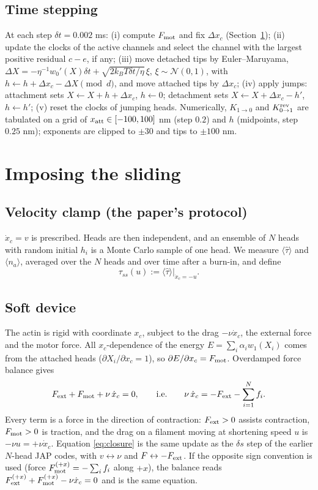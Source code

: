 \documentclass[11pt,a4paper]{article}
\newcommand{\kBT}{k_BT}
\begin{document}
\subsection{Time stepping}
At each step $\delta t=0.002$ ms: (i) compute $F_{\rm mot}$ and fix $\Delta x_c$ (Section~\ref{sec:closure}); (ii) update the clocks of the active channels and select the channel with the largest positive residual $c-e$, if any; (iii) move detached tips by Euler--Maruyama, $\Delta X=-\eta^{-1}w_0'(X)\delta t+\sqrt{2\kBT\delta t/\eta}\,\xi$, $\xi\sim\mathcal N(0,1)$, with $h\leftarrow h+\Delta x_c-\Delta X \pmod d$, and move attached tips by $\Delta x_c$; (iv) apply jumps: attachment sets $X\leftarrow X+h+\Delta x_c$, $h\leftarrow0$; detachment sets $X\leftarrow X+\Delta x_c-h'$, $h\leftarrow h'$; (v) reset the clocks of jumping heads. Numerically, $K_{1\to0}$ and $K^{\rm rev}_{0\to1}$ are tabulated on a grid of $x_{\rm att}\in[-100,100]$ nm (step $0.2$) and $h$ (midpoints, step $0.25$ nm); exponents are clipped to $\pm30$ and tips to $\pm100$ nm.

\section{Imposing the sliding}
\label{sec:closure}

\subsection{Velocity clamp (the paper's protocol)}
$\dot x_c=v$ is prescribed. Heads are then independent, and an ensemble of $N$ heads with random initial $h_i$ is a Monte Carlo sample of one head. We measure $\langle\hat\tau\rangle$ and $\langle n_a\rangle$, averaged over the $N$ heads and over time after a burn-in, and define
\begin{equation}
\tau_{ss}(u):=\langle\hat\tau\rangle\big|_{\dot x_c=-u}.
\end{equation}

\subsection{Soft device}
The actin is rigid with coordinate $x_c$, subject to the drag $-\nu\dot x_c$, the external force and the motor force. All $x_c$-dependence of the energy $E=\sum_i\alpha_iw_1(X_i)$ comes from the attached heads ($\partial X_i/\partial x_c=1$), so $\partial E/\partial x_c=F_{\rm mot}$. Overdamped force balance gives
\begin{equation}
F_{\rm ext}+F_{\rm mot}+\nu\,\dot x_c=0,
\qquad\text{i.e.}\qquad
\nu\,\dot x_c=-F_{\rm ext}-\sum_{i=1}^N f_i .
\label{eq:closure}
\end{equation}
Every term is a force in the direction of contraction: $F_{\rm ext}>0$ assists contraction, $F_{\rm mot}>0$ is traction, and the drag on a filament moving at shortening speed $u$ is $-\nu u=+\nu\dot x_c$. Equation \eqref{eq:closure} is the same update as the $\delta s$ step of the earlier $N$-head JAP codes, with $v\leftrightarrow\nu$ and $F\leftrightarrow-F_{\rm ext}$. If the opposite sign convention is used (force $F^{(+x)}_{\rm mot}=-\sum_if_i$ along $+x$), the balance reads $F^{(+x)}_{\rm ext}+F^{(+x)}_{\rm mot}-\nu\dot x_c=0$ and is the same equation.
\end{document}
